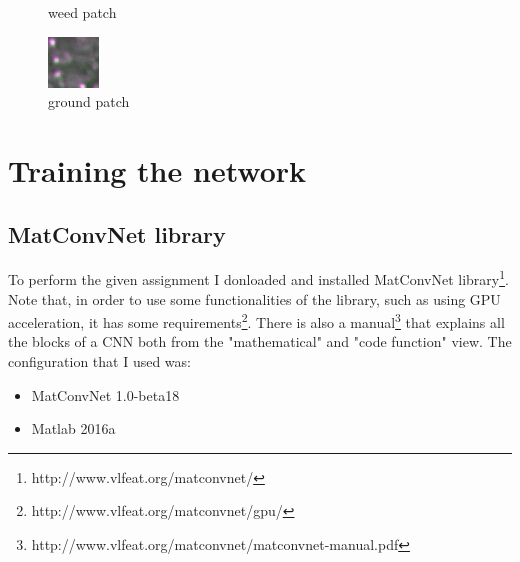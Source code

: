 \documentclass[]{report}
\begin{document}
\begin{figure}[!htb]
  \caption{weed patch}\label{fig:weed sample}
\endminipage\hfill
{}%
  \includegraphics[width=\linewidth]{ground.png}
  \caption{ground patch}\label{fig:ground sample}
\endminipage
\end{figure}



\chapter{Training the network}

\section{MatConvNet library}

To perform the given assignment I donloaded and installed MatConvNet library\footnote{http://www.vlfeat.org/matconvnet/}. Note that, in order to use some functionalities of the library, such as using GPU acceleration, it has some requirements\footnote{http://www.vlfeat.org/matconvnet/gpu/}.
There is also a manual\footnote{http://www.vlfeat.org/matconvnet/matconvnet-manual.pdf} that explains all the blocks of a CNN both from the "mathematical" and "code function" view. The configuration that I used was:

\begin{itemize}

	\item MatConvNet 1.0-beta18
	\item Matlab 2016a	
	
\end{itemize}  
\end{document}
